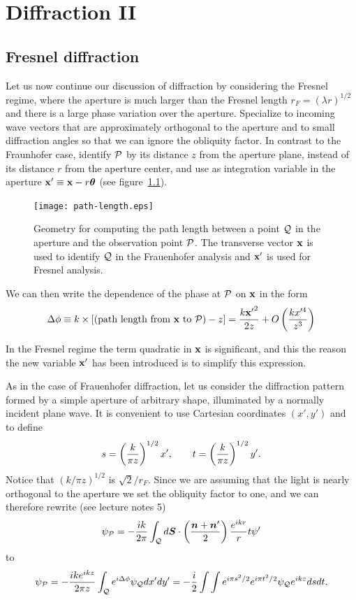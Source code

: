 \chapter{Diffraction II}

\section{Fresnel diffraction}

Let us now continue our discussion of diffraction by considering the Fresnel
regime, where the aperture is much larger than the Fresnel length $r_F=(\lambda r)^{1/2}$ and
there is a large phase variation over the aperture. Specialize to incoming wave
vectors that are approximately orthogonal to the aperture and to small 
diffraction angles so that we can ignore the obliquity factor. In contrast 
to the Fraunhofer case, identify $\cal{P}$ by its distance $z$ from the
aperture plane, instead of its distance $r$ from the aperture center, and
use as integration variable in the aperture 
${\bf x'}\equiv{\bf x}-r{\bm\theta}$ (see figure~\ref{fig:path-length}).

\begin{figure}[h!]
	\centering
	\texttt{[image: path-length.eps]}
  \caption{Geometry for computing the path length between a point $\cal{Q}$ in 
the aperture and the observation point $\cal{P}$. The transverse vector 
$\bf{x}$ is used to identify $\cal{Q}$ in the Frauenhofer analysis and 
$\bf{x'}$ is used for Fresnel analysis.}
  \label{fig:path-length}
\end{figure}
\noindent
We can then write the dependence of the phase at $\cal{P}$ on ${\bf x}$ in 
the form
\[
\Delta\phi\equiv k\times[({\rm path~length~from~}{\bf x}~{\rm to}~{\cal P})-z]
 = {k{\bf x'}^2\over 2z}+O\left({kx'^4\over z^3}\right)
 \label{eq:phase_difference}
\]

In the Fresnel regime the term quadratic in ${\bf x}$ is significant, and
this the reason the new variable ${\bf x'}$ has been introduced is to simplify 
this expression. 

As in the case of Frauenhofer diffraction, let us consider the diffraction pattern formed 
by a simple aperture of arbitrary shape, illuminated by a normally incident
plane wave. It is convenient to use Cartesian coordinates $(x',y')$ and to 
define
\[
s=\left({k\over\pi z}\right)^{1/2}x',\qquad t=\left({k\over\pi z}\right)^{1/2}y'.
\]
\noindent
Notice that $(k/\pi z)^{1/2}$ is $\sqrt{2}/r_{F}$. Since we are assuming that the light is
nearly  orthogonal to the aperture we set the obliquity factor to one, and we can therefore rewrite (see lecture notes 5)
\[
\psi_{\cal P}=-{ik\over 2\pi}\int_{\cal Q}d{\bm S}\cdot\left({{\bm n}+{\bm n'}\over 2}\right){e^{ikr}\over r}t\psi'
\label{eq:small-aperture}
\]
to
\[
\psi_{\cal P}=-{ike^{ikz}\over 2\pi z}\int_{\cal Q}e^{i\Delta\phi}\psi_{\cal Q}dx'dy'
=-{i\over 2}\int\int e^{i\pi s^2/2}e^{i\pi t^2/2}\psi_{\cal Q}e^{ikz}dsdt.
\label{eq:exercise2-chapter7-eq}
\]

